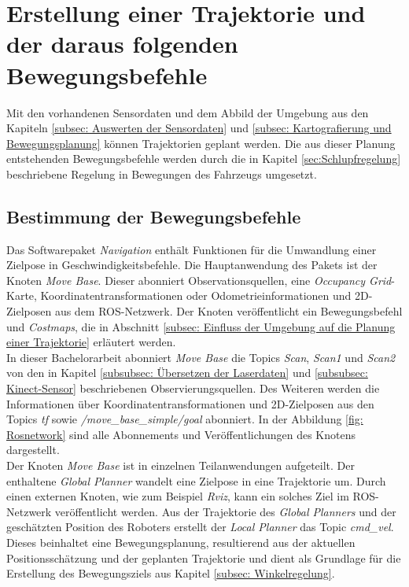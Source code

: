 		 			    
		    \section{Erstellung einer Trajektorie und der daraus folgenden Bewegungsbefehle}
		    \label{subsubsec: Erstellen der Bewegungsplanung}
		    	
		    	Mit den vorhandenen Sensordaten und dem Abbild der Umgebung aus den Kapiteln \ref{subsec: Auswerten der Sensordaten} und \ref{subsec: Kartografierung und Bewegungsplanung} können Trajektorien geplant werden. Die aus dieser Planung entstehenden Bewegungsbefehle werden durch die in Kapitel \ref{sec:Schlupfregelung} beschriebene Regelung in Bewegungen des Fahrzeugs umgesetzt.
		    
		    	\subsection{Bestimmung der Bewegungsbefehle}
		    	\label{subsec: Bewegungsbefehle}
		    	
		    	Das Softwarepaket \textit{Navigation} enthält Funktionen für die Umwandlung einer Zielpose in Geschwindigkeitsbefehle. Die Hauptanwendung des Pakets ist der Knoten \textit{Move Base}. Dieser abonniert Observationsquellen, eine \textit{Occupancy Grid}-Karte, Koordinatentransformationen oder Odometrieinformationen und 2D-Zielposen aus dem ROS-Netzwerk. Der Knoten veröffentlicht ein Bewegungsbefehl und \textit{Costmaps}, die in Abschnitt \ref{subsec: Einfluss der Umgebung auf die Planung einer Trajektorie} erläutert werden. \cite{navigation,movebase}\\ 
		    	
		    	In dieser Bachelorarbeit abonniert \textit{Move Base} die Topics \textit{Scan}, \textit{Scan1} und \textit{Scan2} von den in Kapitel \ref{subsubsec: Übersetzen der Laserdaten} und \ref{subsubsec: Kinect-Sensor} beschriebenen Observierungsquellen. Des Weiteren werden die Informationen über Koordinatentransformationen und 2D-Zielposen aus den Topics \textit{tf} sowie \textit{/move\_base\_simple/goal} abonniert. In der Abbildung \ref{fig: Rosnetwork} sind alle Abonnements und Veröffentlichungen des Knotens dargestellt.\\
		    	
		    	Der Knoten \textit{Move Base} ist in einzelnen Teilanwendungen aufgeteilt. Der enthaltene \textit{Global Planner} wandelt eine Zielpose in eine Trajektorie um. Durch einen externen Knoten, wie zum Beispiel \textit{Rviz}, kann ein solches Ziel im ROS-Netzwerk veröffentlicht werden. Aus der Trajektorie des \textit{Global Planners} und der geschätzten Position des Roboters erstellt der \textit{Local Planner} das Topic \textit{cmd\_vel}. Dieses beinhaltet eine Bewegungsplanung, resultierend aus der aktuellen Positionsschätzung und der geplanten Trajektorie und dient als Grundlage für die Erstellung des Bewegungsziels aus Kapitel \ref{subsec: Winkelregelung}. \cite{movebase,cmdvel}\\
		    	

